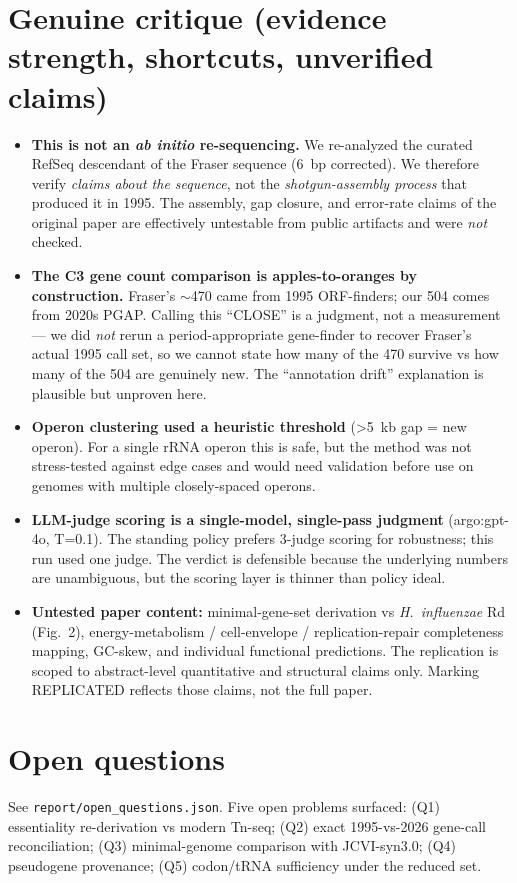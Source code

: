 \documentclass[11pt]{article}
\begin{document}
\section{Genuine critique (evidence strength, shortcuts, unverified claims)}
\begin{itemize}[leftmargin=1.4em]
\item \textbf{This is not an \emph{ab initio} re-sequencing.} We re-analyzed the curated RefSeq
descendant of the Fraser sequence (6~bp corrected). We therefore verify \emph{claims about the
sequence}, not the \emph{shotgun-assembly process} that produced it in 1995. The assembly, gap
closure, and error-rate claims of the original paper are effectively untestable from public
artifacts and were \emph{not} checked.
\item \textbf{The C3 gene count comparison is apples-to-oranges by construction.} Fraser's
$\sim$470 came from 1995 ORF-finders; our 504 comes from 2020s PGAP. Calling this ``CLOSE'' is a
judgment, not a measurement --- we did \emph{not} rerun a period-appropriate gene-finder to
recover Fraser's actual 1995 call set, so we cannot state how many of the 470 survive vs how many
of the 504 are genuinely new. The ``annotation drift'' explanation is plausible but unproven here.
\item \textbf{Operon clustering used a heuristic threshold} (>5~kb gap = new operon). For a
single rRNA operon this is safe, but the method was not stress-tested against edge cases and
would need validation before use on genomes with multiple closely-spaced operons.
\item \textbf{LLM-judge scoring is a single-model, single-pass judgment} (argo:gpt-4o, T=0.1).
The standing policy prefers 3-judge scoring for robustness; this run used one judge. The verdict
is defensible because the underlying numbers are unambiguous, but the scoring layer is thinner
than policy ideal.
\item \textbf{Untested paper content:} minimal-gene-set derivation vs \textit{H.\ influenzae} Rd
(Fig.~2), energy-metabolism / cell-envelope / replication-repair completeness mapping, GC-skew,
and individual functional predictions. The replication is scoped to abstract-level quantitative
and structural claims only. Marking REPLICATED reflects those claims, not the full paper.
\end{itemize}

\section{Open questions}
See \texttt{report/open\_questions.json}. Five open problems surfaced: (Q1) essentiality
re-derivation vs modern Tn-seq; (Q2) exact 1995-vs-2026 gene-call reconciliation; (Q3)
minimal-genome comparison with JCVI-syn3.0; (Q4) pseudogene provenance; (Q5) codon/tRNA
sufficiency under the reduced set.
\end{document}
